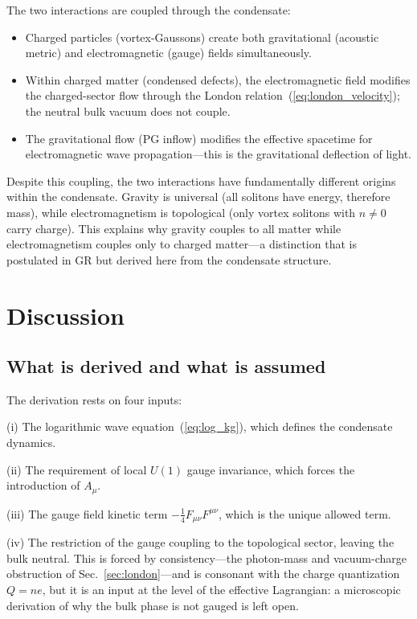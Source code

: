 \documentclass[12pt, a4paper]{article}
\begin{document}
The two interactions are coupled through the condensate:
\begin{itemize}
\item Charged particles (vortex-Gaussons) create 
  both gravitational (acoustic metric) and
  electromagnetic (gauge) fields simultaneously.
\item Within charged matter (condensed defects), the
  electromagnetic field modifies the charged-sector
  flow through the London
  relation~(\ref{eq:london_velocity}); the neutral
  bulk vacuum does not couple.
\item The gravitational flow (PG inflow) modifies
  the effective spacetime for electromagnetic
  wave propagation---this is the gravitational
  deflection of light.
\end{itemize}

Despite this coupling, the two interactions have fundamentally different origins within the condensate. Gravity is universal (all solitons have energy, therefore mass), while electromagnetism is topological (only vortex solitons with $n \neq 0$ carry charge). This explains why gravity couples to all matter while electromagnetism couples only to charged matter---a distinction that is postulated in GR but derived here from the condensate structure.

\section{Discussion}
\label{sec:discussion}

\subsection{What is derived and what is assumed}

The derivation rests on four inputs:

(i) The logarithmic wave equation~(\ref{eq:log_kg}), which defines the condensate dynamics.

(ii) The requirement of local $U(1)$ gauge invariance, which forces the introduction of $A_\mu$.

(iii) The gauge field kinetic term $-\frac{1}{4}F_{\mu\nu}F^{\mu\nu}$, which is the unique allowed term.

(iv) The restriction of the gauge coupling to the topological sector, leaving the bulk neutral. This is forced by consistency---the photon-mass and vacuum-charge obstruction of Sec.~\ref{sec:london}---and is consonant with the charge quantization $Q = ne$, but it is an input at the level of the effective Lagrangian: a microscopic derivation of why the bulk phase is not gauged is left open.
\end{document}
